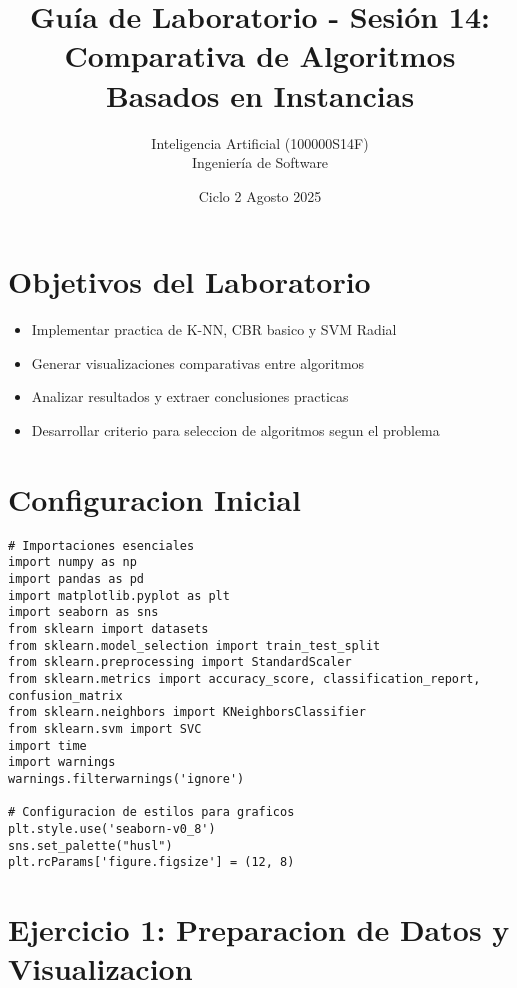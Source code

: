\documentclass[12pt]{article}
\title{Guía de Laboratorio - Sesión 14: Comparativa de Algoritmos Basados en Instancias}
\author{Inteligencia Artificial (100000S14F) \\ Ingeniería de Software}
\date{Ciclo 2 Agosto 2025}
\begin{document}
\maketitle

\section*{Objetivos del Laboratorio}
\begin{itemize}
    \item Implementar practica de K-NN, CBR basico y SVM Radial
    \item Generar visualizaciones comparativas entre algoritmos
    \item Analizar resultados y extraer conclusiones practicas
    \item Desarrollar criterio para seleccion de algoritmos segun el problema
\end{itemize}

\section{Configuracion Inicial}

\begin{lstlisting}
# Importaciones esenciales
import numpy as np
import pandas as pd
import matplotlib.pyplot as plt
import seaborn as sns
from sklearn import datasets
from sklearn.model_selection import train_test_split
from sklearn.preprocessing import StandardScaler
from sklearn.metrics import accuracy_score, classification_report, confusion_matrix
from sklearn.neighbors import KNeighborsClassifier
from sklearn.svm import SVC
import time
import warnings
warnings.filterwarnings('ignore')

# Configuracion de estilos para graficos
plt.style.use('seaborn-v0_8')
sns.set_palette("husl")
plt.rcParams['figure.figsize'] = (12, 8)
\end{lstlisting}

\section{Ejercicio 1: Preparacion de Datos y Visualizacion}
\end{document}
